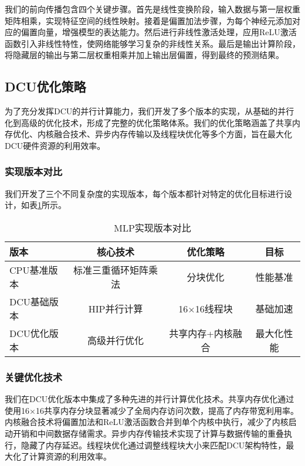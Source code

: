 \documentclass[12pt,a4paper]{article}
\begin{document}
我们的前向传播包含四个关键步骤。首先是线性变换阶段，输入数据与第一层权重矩阵相乘，实现特征空间的线性映射。接着是偏置加法步骤，为每个神经元添加对应的偏置向量，增强模型的表达能力。然后进行非线性激活处理，应用ReLU激活函数引入非线性特性，使网络能够学习复杂的非线性关系。最后是输出计算阶段，将隐藏层的输出与第二层权重相乘并加上输出层偏置，得到最终的预测结果。

\subsection{DCU优化策略}

为了充分发挥DCU的并行计算能力，我们开发了多个版本的实现，从基础的并行化到高级的优化技术，形成了完整的优化策略体系。我们的优化策略涵盖了共享内存优化、内核融合技术、异步内存传输以及线程块优化等多个方面，旨在最大化DCU硬件资源的利用效率。

\subsubsection{实现版本对比}

我们开发了三个不同复杂度的实现版本，每个版本都针对特定的优化目标进行设计，如表\ref{tab:mlp_versions}所示。

\begin{table}[H]
\centering
\caption{MLP实现版本对比}
\label{tab:mlp_versions}
\begin{tabular}{lccc}
\toprule
版本 & 核心技术 & 优化策略 & 目标 \\
\midrule
CPU基准版本 & 标准三重循环矩阵乘法 & 分块优化 & 性能基准 \\
DCU基础版本 & HIP并行计算 & 16×16线程块 & 基础加速 \\
DCU优化版本 & 高级并行优化 & 共享内存+内核融合 & 最大化性能 \\
\bottomrule
\end{tabular}
\end{table}

\subsubsection{关键优化技术}

我们在DCU优化版本中集成了多种先进的并行计算优化技术。共享内存优化通过使用16×16共享内存分块显著减少了全局内存访问次数，提高了内存带宽利用率。内核融合技术将偏置加法和ReLU激活函数合并到单个内核中执行，减少了内核启动开销和中间数据存储需求。异步内存传输技术实现了计算与数据传输的重叠执行，隐藏了内存延迟。线程块优化通过调整线程块大小来匹配DCU架构特性，最大化了计算资源的利用效率。
\end{document}
